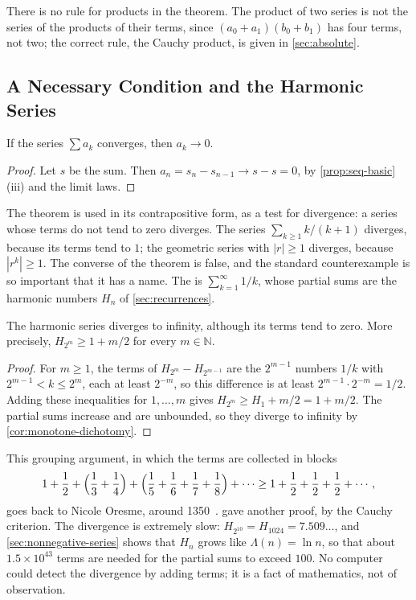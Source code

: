 There is no rule for products in the theorem. The product of two series is not the series of the products of their terms, since $(a_0+a_1)(b_0+b_1)$ has four terms, not two; the correct rule, the Cauchy product, is given in \cref{sec:absolute}.

\subsection{A Necessary Condition and the Harmonic Series}

\begin{theorem}
\label{thm:term-test}
If the series $\sum a_k$ converges, then $a_k\to0$.
\end{theorem}

\begin{proof}
Let $s$ be the sum. Then $a_n=s_n-s_{n-1}\to s-s=0$, by \cref{prop:seq-basic}\,(iii) and the limit laws.
\end{proof}

The theorem is used in its contrapositive form, as a test for divergence: a series whose terms do not tend to zero diverges. The series $\sum_{k\ge1}k/(k+1)$ diverges, because its terms tend to $1$; the geometric series with $|r|\ge1$ diverges, because $|r^k|\ge1$. The converse of the theorem is false, and the standard counterexample is so important that it has a name. The  is $\sum_{k=1}^\infty1/k$, whose partial sums are the harmonic numbers $H_n$ of \cref{sec:recurrences}.

\begin{proposition}
\label{prop:harmonic-diverges}
The harmonic series diverges to infinity, although its terms tend to zero. More precisely, $H_{2^m}\ge1+m/2$ for every $m\in\mathbb N$.
\end{proposition}

\begin{proof}
For $m\ge1$, the terms of $H_{2^m}-H_{2^{m-1}}$ are the $2^{m-1}$ numbers $1/k$ with $2^{m-1}<k\le2^m$, each at least $2^{-m}$, so this difference is at least $2^{m-1}\cdot2^{-m}=1/2$. Adding these inequalities for $1,\ldots,m$ gives $H_{2^m}\ge H_1+m/2=1+m/2$. The partial sums increase and are unbounded, so they diverge to infinity by \cref{cor:monotone-dichotomy}.
\end{proof}

This grouping argument, in which the terms are collected in blocks
\[
1+\frac12+\Bigl(\frac13+\frac14\Bigr)+\Bigl(\frac15+\frac16+\frac17+\frac18\Bigr)+\cdots\ge1+\frac12+\frac12+\frac12+\cdots,
\]
goes back to Nicole Oresme, around 1350~\cite{edwards1979,hairer1996analysis}.  gave another proof, by the Cauchy criterion. The divergence is extremely slow: $H_{2^{10}}=H_{1024}=7.509\ldots$, and \cref{sec:nonnegative-series} shows that $H_n$ grows like $\Lambda(n)=\ln n$, so that about $1.5\times10^{43}$ terms are needed for the partial sums to exceed $100$. No computer could detect the divergence by adding terms; it is a fact of mathematics, not of observation.


